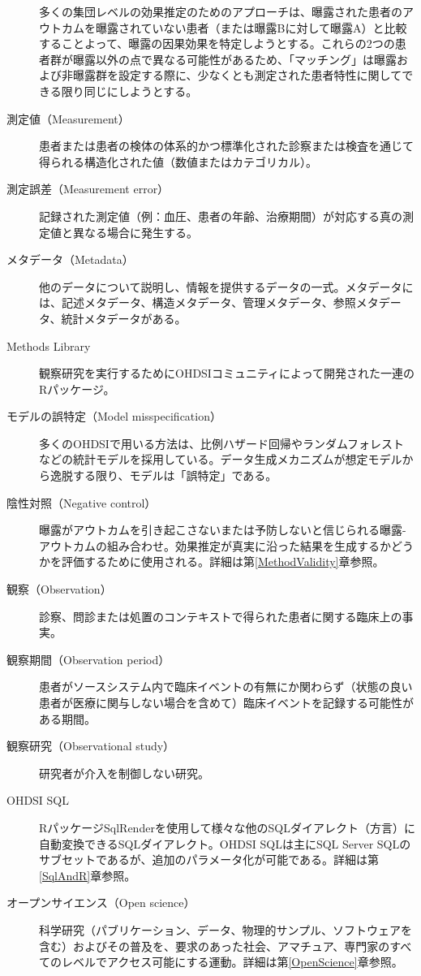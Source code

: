 \documentclass[
  11pt]{book}
\theoremstyle{definition}
\theoremstyle{definition}
\theoremstyle{definition}
\theoremstyle{definition}
\theoremstyle{remark}
\begin{document}
\begin{description}
多くの集団レベルの効果推定のためのアプローチは、曝露された患者のアウトカムを曝露されていない患者（または曝露Bに対して曝露A）と比較することよって、曝露の因果効果を特定しようとする。これらの2つの患者群が曝露以外の点で異なる可能性があるため、「マッチング」は曝露および非曝露群を設定する際に、少なくとも測定された患者特性に関してできる限り同じにしようとする。
\item[測定値（Measurement）]
患者または患者の検体の体系的かつ標準化された診察または検査を通じて得られる構造化された値（数値またはカテゴリカル）。
\item[測定誤差（Measurement error）]
記録された測定値（例：血圧、患者の年齢、治療期間）が対応する真の測定値と異なる場合に発生する。
\item[メタデータ（Metadata）]
他のデータについて説明し、情報を提供するデータの一式。メタデータには、記述メタデータ、構造メタデータ、管理メタデータ、参照メタデータ、統計メタデータがある。
\item[Methods Library]
観察研究を実行するためにOHDSIコミュニティによって開発された一連のRパッケージ。
\item[モデルの誤特定（Model misspecification）]
多くのOHDSIで用いる方法は、比例ハザード回帰やランダムフォレストなどの統計モデルを採用している。データ生成メカニズムが想定モデルから逸脱する限り、モデルは「誤特定」である。
\item[陰性対照（Negative control）]
曝露がアウトカムを引き起こさないまたは予防しないと信じられる曝露-アウトカムの組み合わせ。効果推定が真実に沿った結果を生成するかどうかを評価するために使用される。詳細は第\ref{MethodValidity}章参照。
\item[観察（Observation）]
診察、問診または処置のコンテキストで得られた患者に関する臨床上の事実。
\item[観察期間（Observation period）]
患者がソースシステム内で臨床イベントの有無にか関わらず（状態の良い患者が医療に関与しない場合を含めて）臨床イベントを記録する可能性がある期間。
\item[観察研究（Observational study）]
研究者が介入を制御しない研究。
\item[OHDSI SQL]
RパッケージSqlRenderを使用して様々な他のSQLダイアレクト（方言）に自動変換できるSQLダイアレクト。OHDSI SQLは主にSQL Server SQLのサブセットであるが、追加のパラメータ化が可能である。詳細は第\ref{SqlAndR}章参照。
\item[オープンサイエンス（Open science）]
科学研究（パブリケーション、データ、物理的サンプル、ソフトウェアを含む）およびその普及を、要求のあった社会、アマチュア、専門家のすべてのレベルでアクセス可能にする運動。詳細は第\ref{OpenScience}章参照。

\end{description}
\end{document}
